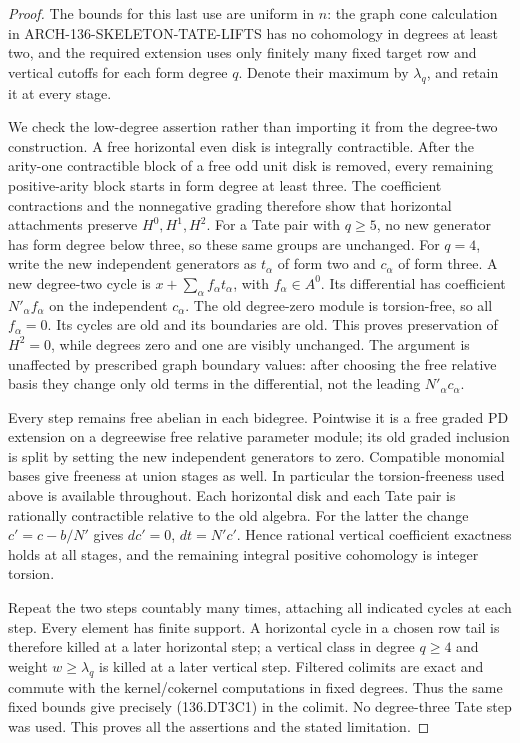 \begin{proof}
The bounds for this last use are uniform in \(n\): the graph
cone calculation in ARCH-136-SKELETON-TATE-LIFTS has no
cohomology in degrees at least two, and the required extension
uses only finitely many fixed target row and vertical cutoffs
for each form degree \(q\). Denote their maximum by
\(\lambda_q\), and retain it at every stage.

We check the low-degree assertion rather than importing it
from the degree-two construction. A free horizontal even disk
is integrally contractible. After the arity-one contractible
block of a free odd unit disk is removed, every remaining
positive-arity block starts in form degree at least three. The
coefficient contractions and the nonnegative grading therefore
show that horizontal attachments preserve \(H^0,H^1,H^2\).
For a Tate pair with \(q\geq5\), no new generator has form
degree below three, so these same groups are unchanged.
For \(q=4\), write the new independent generators as
\(t_\alpha\) of form two and \(c_\alpha\) of form three.
A new degree-two cycle is
\(x+\sum_\alpha f_\alpha t_\alpha\), with
\(f_\alpha\in A^0\). Its differential has coefficient
\(N'_\alpha f_\alpha\) on the independent \(c_\alpha\).
The old degree-zero module is torsion-free, so all
\(f_\alpha=0\). Its cycles are old and its boundaries
are old. This proves preservation of \(H^2=0\), while
degrees zero and one are visibly unchanged. The argument is
unaffected by prescribed graph boundary values: after choosing
the free relative basis they change only old terms in the
differential, not the leading \(N'_\alpha c_\alpha\).

Every step remains free abelian in each bidegree. Pointwise
it is a free graded PD extension on a degreewise free relative
parameter module; its old graded inclusion is split by setting
the new independent generators to zero. Compatible monomial
bases give freeness at union stages as well. In particular the
torsion-freeness used above is available throughout.
Each horizontal disk and each Tate pair is rationally
contractible relative to the old algebra. For the latter the
change \(c'=c-b/N'\) gives \(dc'=0\), \(dt=N'c'\).
Hence rational vertical coefficient exactness holds at all
stages, and the remaining integral positive cohomology is
integer torsion.

Repeat the two steps countably many times, attaching all
indicated cycles at each step. Every element has finite
support. A horizontal cycle in a chosen row tail is therefore
killed at a later horizontal step; a vertical class in degree
\(q\geq4\) and weight \(w\geq\lambda_q\) is killed at
a later vertical step. Filtered colimits are exact and commute
with the kernel/cokernel computations in fixed degrees. Thus
the same fixed bounds give precisely (136.DT3C1) in the
colimit. No degree-three Tate step was used. This proves
all the assertions and the stated limitation.
\end{proof}

